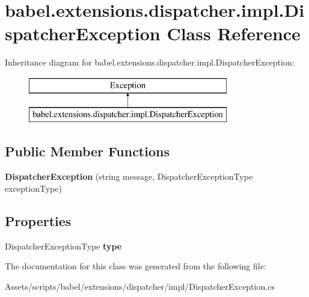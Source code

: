 \hypertarget{classbabel_1_1extensions_1_1dispatcher_1_1impl_1_1_dispatcher_exception}{\section{babel.\-extensions.\-dispatcher.\-impl.\-Dispatcher\-Exception Class Reference}
\label{classbabel_1_1extensions_1_1dispatcher_1_1impl_1_1_dispatcher_exception}
}
Inheritance diagram for babel.\-extensions.\-dispatcher.\-impl.\-Dispatcher\-Exception\-:\begin{figure}[H]
\begin{center}
\leavevmode
\includegraphics[height=2.000000cm]{classbabel_1_1extensions_1_1dispatcher_1_1impl_1_1_dispatcher_exception}
\end{center}
\end{figure}
\subsection*{Public Member Functions}
\begin{DoxyCompactItemize}
\item 
\hypertarget{classbabel_1_1extensions_1_1dispatcher_1_1impl_1_1_dispatcher_exception_a93ace204c997e81bec48f4b0f8f6692c}{{\bfseries Dispatcher\-Exception} (string message, Dispatcher\-Exception\-Type exception\-Type)}\label{classbabel_1_1extensions_1_1dispatcher_1_1impl_1_1_dispatcher_exception_a93ace204c997e81bec48f4b0f8f6692c}

\end{DoxyCompactItemize}
\subsection*{Properties}
\begin{DoxyCompactItemize}
\item 
\hypertarget{classbabel_1_1extensions_1_1dispatcher_1_1impl_1_1_dispatcher_exception_a441a04dc3df4fe74f3f88ec376cbc264}{Dispatcher\-Exception\-Type {\bfseries type}}\label{classbabel_1_1extensions_1_1dispatcher_1_1impl_1_1_dispatcher_exception_a441a04dc3df4fe74f3f88ec376cbc264}

\end{DoxyCompactItemize}


The documentation for this class was generated from the following file\-:\begin{DoxyCompactItemize}
\item 
Assets/scripts/babel/extensions/dispatcher/impl/Dispatcher\-Exception.\-cs\end{DoxyCompactItemize}
